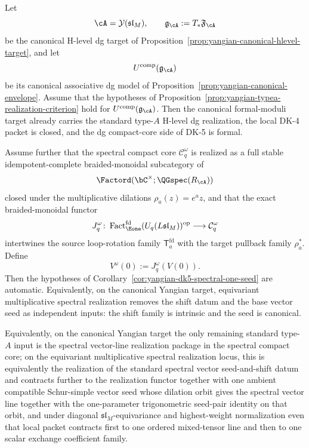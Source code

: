 \begin{corollary}
\label{cor:yangian-canonical-realization-to-spectral-seed}
Let
\[
\cA=\mathcal{Y}(\mathfrak{sl}_M),
\qquad
\mathfrak{g}_{\cA}:=T_*\mathfrak{F}_{\cA}
\]
be the canonical H-level dg target of
Proposition~\ref{prop:yangian-canonical-hlevel-target}, and let
\[
U^{\mathrm{comp}}(\mathfrak{g}_{\cA})
\]
be its canonical associative dg model of
Proposition~\ref{prop:yangian-canonical-envelope}. Assume that the
hypotheses of Proposition~\ref{prop:yangian-typea-realization-criterion}
hold for \(U^{\mathrm{comp}}(\mathfrak{g}_{\cA})\). Then the canonical
formal-moduli target already carries the standard type-$A$ H-level dg
realization, the local DK-4 packet is closed, and the dg compact-core
side of DK-5 is formal.

Assume further that the spectral compact core \(\mathcal C_q^\omega\)
is realized as a full stable idempotent-complete braided-monoidal
subcategory of
\[
\Factord(\bC^\times;\QGspec(R_{\cA}))
\]
closed under the multiplicative dilations
\(\rho_a(z)=e^a z\), and that the exact braided-monoidal functor
\[
J_q^\omega\colon
\operatorname{Fact}_{\Eone}^{\mathrm{fd}}(U_q(L\mathfrak{sl}_M))^{\mathrm{op}}
\longrightarrow
\mathcal C_q^\omega
\]
intertwines the source loop-rotation family
\(\mathsf T_a^{\mathrm{fd}}\) with the target pullback family
\(\rho_a^*\). Define
\[
V^\omega(0):=J_q^\omega(V(0)).
\]
Then the hypotheses of
Corollary~\ref{cor:yangian-dk5-spectral-one-seed} are automatic.
Equivalently, on the canonical Yangian target, equivariant
multiplicative spectral realization removes the shift datum and the
base vector seed as independent inputs: the shift family is intrinsic
and the seed is canonical.

Equivalently, on the canonical Yangian target the only remaining
standard type-$A$ input is the spectral vector-line realization
package in the spectral compact core; on the equivariant
multiplicative spectral realization locus, this is equivalently the
realization of the standard spectral vector seed-and-shift datum and
contracts further to the realization functor together with one ambient
compatible
Schur-simple vector seed whose dilation orbit gives the spectral
vector line together with the one-parameter trigonometric seed-pair
identity on that orbit, and under diagonal
\(\mathfrak{sl}_M\)-equivariance and highest-weight normalization even
that local packet contracts first to one ordered mixed-tensor line and
then to one scalar exchange coefficient family.


\end{corollary}
